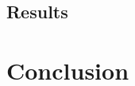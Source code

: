\documentclass[11pt]{article}
\begin{document}

\subsection{Results}
\label{sec:results}


\section{Conclusion}
\label{sec:conclusion}




\end{document}
